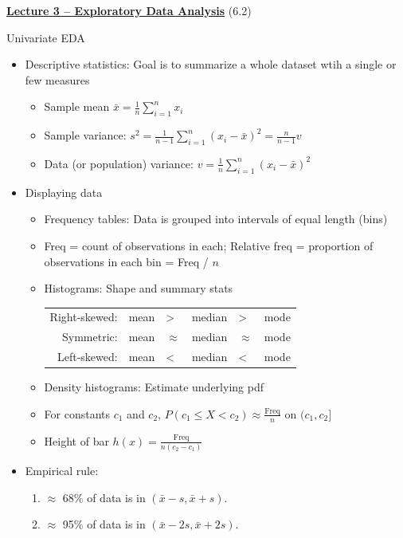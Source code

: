 \documentclass{article}
\newcommand{\bu}[1]{\textbf{\ul{#1}}}				%
\begin{document}
\newpage

{\large \bu{Lecture 3 -- Exploratory Data Analysis}} (6.2)\bigskip

Univariate EDA
\begin{itemize}
    \item Descriptive statistics: Goal is to summarize a whole dataset wtih a single or few measures
    \begin{itemize}
        \item Sample mean $\displaystyle \bar{x} = \frac{1}{n} \sum_{i = 1}^n x_i$
        \item Sample variance: $\displaystyle s^2 = \frac{1}{n - 1} \sum_{i = 1}^n (x_i - \bar{x})^2 = \frac{n}{n - 1} v$
        \item Data (or population) variance: $\displaystyle v = \frac{1}{n} \sum_{i = 1}^n (x_i - \bar{x})^2$
    \end{itemize}
    \item Displaying data
    \begin{itemize}
        \item Frequency tables: Data is grouped into intervals of equal length (bins)
        \item[] Freq = count of observations in each; Relative freq = proportion of observations in each bin = Freq / $n$
        \item Histograms: Shape and summary stats\smallskip\\
        \begin{tabular}{rlllll}
            Right-skewed: & mean & > & median & > & mode \\
            Symmetric: & mean & $\approx$ & median & $\approx$ & mode \\
            Left-skewed: & mean & < & median & < & mode \\
        \end{tabular}
        \item Density histograms: Estimate underlying pdf
        \item[] For constants $c_1$ and $c_2$, $P(c_1 \le X < c_2) \approx  \frac{\text{Freq}}{n}$ on $(c_1, c_2]$
        \item[] Height of bar $h(x) = \frac{\text{Freq}}{n (c_2 - c_1)}$
    \end{itemize}
    \item Empirical rule:
    \begin{enumerate}
        \item $\approx$ 68\% of data is in $(\bar{x} - s, \bar{x} + s)$.
        \item $\approx$ 95\% of data is in $(\bar{x} - 2s, \bar{x} + 2s)$.

\end{enumerate}
\end{itemize}
\end{document}
